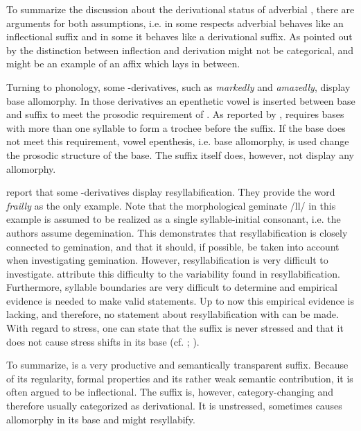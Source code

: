 To summarize the discussion about the derivational status of adverbial , there are arguments for both assumptions, i.e. in some respects adverbial  behaves like an inflectional suffix and in some it behaves like a derivational suffix. As pointed out by \citet[196]{Plag.2003} the distinction between inflection and derivation might not be categorical, and  might be an example of an affix which lays in between.

Turning to phonology, some -derivatives, such as  \textit{markedly} and \textit{amazedly}, display base allomorphy. In those derivatives an epenthetic vowel is inserted between base and suffix to meet the prosodic requirement of . As reported by \citet[172]{Bauer.2013},  requires bases with more than one syllable to form a  trochee before the suffix. If the base does not meet this requirement, vowel epenthesis, i.e. base allomorphy, is used change the prosodic structure of the base. The suffix itself does, however, not display any allomorphy. 

\citet[163]{Bauer.2013} report that some -derivatives display resyllabification. They provide the word \textit{frailly} as the only example. Note that the morphological geminate /ll/ in this example is assumed to be realized as a single syllable-initial consonant, i.e. the authors assume degemination. This demonstrates that resyllabification is closely connected to gemination, and that it should, if possible, be taken into account when investigating gemination.
However, resyllabification is very difficult to investigate. \citet[168]{Bauer.2013} attribute  this difficulty to the variability found in resyllabification. Furthermore, syllable boundaries are very difficult to determine and empirical evidence is needed to make valid statements. Up to now this empirical evidence is lacking, and therefore, no statement about resyllabification with  can be made.
With regard to stress, one can state that the suffix is never stressed and that it does not cause stress shifts in its base (cf. \citealt[1670]{Bauer.2002}; \citealt[323]{Bauer.2013}).

To summarize,  is a very productive and semantically transparent suffix. Because of its regularity, formal properties and its rather weak semantic contribution, it is often argued to be inflectional. The suffix is, however, category-changing and therefore usually categorized as derivational. It is unstressed, sometimes causes allomorphy in its base and might resyllabify.


